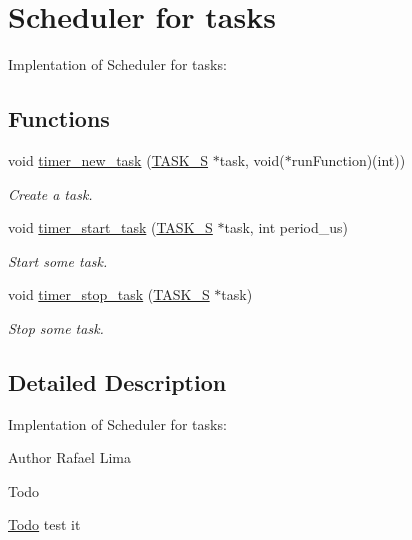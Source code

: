 \hypertarget{group__taskS}{\section{Scheduler for tasks}
\label{group__taskS}
}


Implentation of Scheduler for tasks\-:  


\subsection*{Functions}
\begin{DoxyCompactItemize}
\item 
void \hyperlink{group__taskS_ga1e7e694ed290112386d363ee2630dd82}{timer\-\_\-new\-\_\-task} (\hyperlink{structTASK__S}{T\-A\-S\-K\-\_\-\-S} $\ast$task, void($\ast$run\-Function)(int))
\begin{DoxyCompactList}\small\item\em Create a task. \end{DoxyCompactList}\item 
void \hyperlink{group__taskS_gabb62dbc29029e7950ee72aeb78c83dfc}{timer\-\_\-start\-\_\-task} (\hyperlink{structTASK__S}{T\-A\-S\-K\-\_\-\-S} $\ast$task, int period\-\_\-us)
\begin{DoxyCompactList}\small\item\em Start some task. \end{DoxyCompactList}\item 
void \hyperlink{group__taskS_ga8e48eacaac7d9cf7d82cc71cfbcd4b56}{timer\-\_\-stop\-\_\-task} (\hyperlink{structTASK__S}{T\-A\-S\-K\-\_\-\-S} $\ast$task)
\begin{DoxyCompactList}\small\item\em Stop some task. \end{DoxyCompactList}\end{DoxyCompactItemize}


\subsection{Detailed Description}
Implentation of Scheduler for tasks\-: \begin{DoxyAuthor}{Author}
Rafael Lima 
\end{DoxyAuthor}
\begin{DoxyRefDesc}{Todo}
\item[\hyperlink{todo__todo000004}{Todo}]test it \end{DoxyRefDesc}


